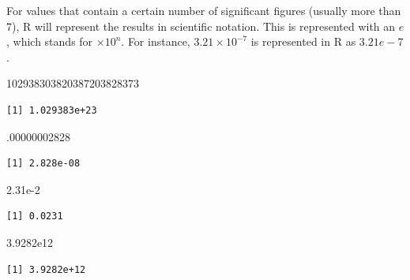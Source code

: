 \documentclass[
  letterpaper,
  DIV=11,
  numbers=noendperiod]{scrreprt}
\newenvironment{Shaded}{\begin{snugshade}}{\end{snugshade}}
\newcommand{\DecValTok}[1]{\textcolor[rgb]{0.68,0.00,0.00}{#1}}
\newcommand{\FloatTok}[1]{\textcolor[rgb]{0.68,0.00,0.00}{#1}}
\newcommand{\NormalTok}[1]{\textcolor[rgb]{0.00,0.23,0.31}{#1}}
\begin{document}
For values that contain a certain number of significant figures (usually
more than 7), R will represent the results in scientific notation. This
is represented with an \(e\), which stands for \(\times 10^n\). For
instance, \(3.21\times 10^{-7}\) is represented in R as \(3.21e-7\).

\begin{Shaded}
\begin{Highlighting}[]
\DecValTok{102938303820387203828373}
\end{Highlighting}
\end{Shaded}

\begin{verbatim}
[1] 1.029383e+23
\end{verbatim}

\begin{Shaded}
\begin{Highlighting}[]
\NormalTok{.}\DecValTok{00000002828}
\end{Highlighting}
\end{Shaded}

\begin{verbatim}
[1] 2.828e-08
\end{verbatim}

\begin{Shaded}
\begin{Highlighting}[]
\FloatTok{2.31e{-}2}
\end{Highlighting}
\end{Shaded}

\begin{verbatim}
[1] 0.0231
\end{verbatim}

\begin{Shaded}
\begin{Highlighting}[]
\FloatTok{3.9282e12}
\end{Highlighting}
\end{Shaded}

\begin{verbatim}
[1] 3.9282e+12
\end{verbatim}
\end{document}
